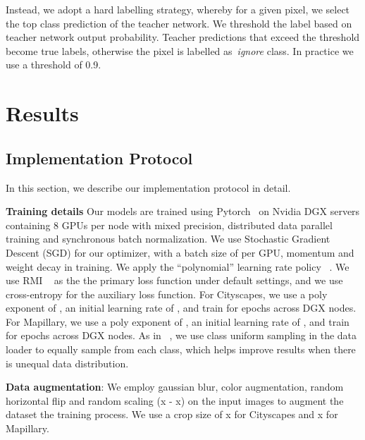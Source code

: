 \documentclass{article}
\begin{document}
Instead, we adopt a hard labelling strategy, whereby for a given pixel, we select the top class prediction of the teacher network. We threshold the label based on teacher network output probability. Teacher predictions that exceed the threshold become true labels, otherwise the pixel is labelled as~\textit{ignore} class. In practice we use a threshold of 0.9.


\section{Results}

\subsection{Implementation Protocol}
In this section, we describe our implementation protocol in detail.

\textbf{Training details} Our models are trained using Pytorch~\cite{NEURIPS2019_9015} on Nvidia DGX servers containing 8 GPUs per node with mixed precision, distributed data parallel training and synchronous batch normalization. We use Stochastic Gradient Descent (SGD) for our optimizer, with a batch size of  per GPU, momentum  and weight decay  in training. We apply the “polynomial” learning rate policy ~\cite{liu2015parsenet}. We use RMI ~\cite{zhao2019rmi} as the the primary loss function under default settings, and we use cross-entropy for the auxiliary loss function. For Cityscapes, we use a poly exponent of , an initial learning rate of , and train for  epochs across  DGX nodes. For Mapillary, we use a poly exponent of , an initial learning rate of , and train for  epochs across  DGX nodes. As in ~\cite{semantic_cvpr19}, we use class uniform sampling in the data loader to equally sample from each class, which helps improve results when there is unequal data distribution.

\textbf{Data augmentation}: We employ gaussian blur, color augmentation, random horizontal flip and random scaling (x - x) on the input images to augment the dataset the training process. We use a crop size of x for Cityscapes and x for Mapillary.
\end{document}
